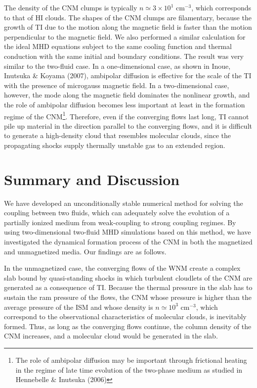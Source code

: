 \documentclass[12pt,preprint]{aastex}
\begin{document}
The density of the CNM clumps is typically $n\simeq 3\times10^{1}$ cm$^{-3}$, which corresponds to that of HI clouds.
The shapes of the CNM clumps are filamentary, because the growth of TI due to the motion along the magnetic field is faster than the motion perpendicular to the magnetic field.
We also performed a similar calculation for the ideal MHD equations subject to the same cooling function and thermal conduction with the same initial and boundary conditions.
The result was very similar to the two-fluid case.
In a one-dimensional case, as shown in Inoue, Inutsuka \& Koyama (2007), ambipolar diffusion is effective for the scale of the TI with the presence of microgauss magnetic field.
In a two-dimensional case, however, the mode along the magnetic field dominates the nonlinear growth, and the role of ambipolar diffusion becomes less important at least in the formation regime of the CNM\footnote{The role of ambipolar diffusion may be important through frictional heating in the regime of late time evolution of the two-phase medium as studied in Hennebelle \& Inutsuka (2006)}.
Therefore, even if the converging flows last long, TI cannot pile up material in the direction parallel to the converging flows, and it is difficult to generate a high-density cloud that resembles molecular clouds, since the propagating shocks supply thermally unstable gas to an extended region.


\section{Summary and Discussion}
We have developed an unconditionally stable numerical method for solving the coupling between two fluids, which can adequately solve the evolution of a partially ionized medium from weak-coupling to strong coupling regimes.
By using two-dimensional two-fluid MHD simulations based on this method, we have investigated the dynamical formation process of the CNM in both the magnetized and unmagnetized media.
Our findings are as follows.

In the unmagnetized case, the converging flows of the WNM create a complex slab bound by quasi-standing shocks in which turbulent cloudlets of the CNM are generated as a consequence of TI.
Because the thermal pressure in the slab has to sustain the ram pressure of the flows, the CNM whose pressure is higher than the average pressure of the ISM and whose density is $n\simeq 10^{3}$ cm$^{-3}$, which correspond to the observational characteristics of molecular clouds, is inevitably formed.
Thus, as long as the converging flows continue, the column density of the CNM increases, and a molecular cloud would be generated in the slab.
\end{document}
